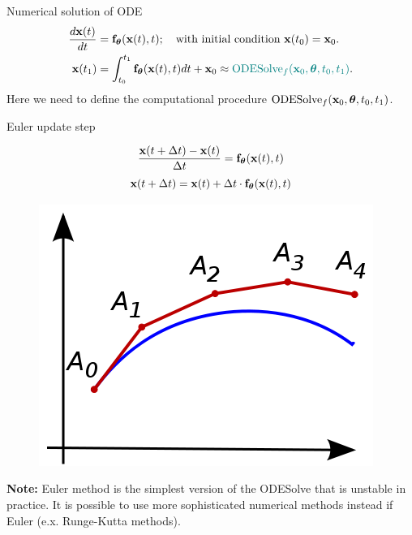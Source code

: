 \begin{frame}{Numerical solution of ODE}
	\vspace{-0.5cm}
	\begin{align*}
		\frac{d \mathbf{x}(t)}{dt} &= \mathbf{f}_{\boldsymbol{\theta}}(\mathbf{x}(t), t); \quad \text{with initial condition }\mathbf{x}(t_0) = \mathbf{x}_0. \\
		\mathbf{x}(t_1) &= \int^{t_1}_{t_0} \mathbf{f}_{\boldsymbol{\theta}}(\mathbf{x}(t), t) d t  + \mathbf{x}_0 \approx {\color{teal}\text{ODESolve}_f(\mathbf{x}_0, \boldsymbol{\theta}, t_0, t_1)}.
	\end{align*}
	Here we need to define the computational procedure $\text{ODESolve}_f(\mathbf{x}_0, \boldsymbol{\theta}, t_0, t_1)$.
	\begin{block}{Euler update step}
		\begin{minipage}[t]{0.6\columnwidth}
			\vspace{-0.5cm}
			\[
	  			\frac{\mathbf{x}(t + \Delta t) - \mathbf{x}(t)}{\Delta t} = \mathbf{f}_{\boldsymbol{\theta}}(\mathbf{x}(t), t)
			\]
			\[
	  			\mathbf{x}(t + \Delta t) = \mathbf{x}(t) + \Delta t \cdot \mathbf{f}_{\boldsymbol{\theta}}(\mathbf{x}(t), t)
			\]
		\end{minipage}%
		\begin{minipage}[t]{0.4\columnwidth}
			\vspace{-0.3cm}
			\begin{figure}
				\centering
				\includegraphics[width=0.7\linewidth]{figs/euler}
			\end{figure}
		\end{minipage}
	\end{block}
	\textbf{Note:} Euler method is the simplest version of the ODESolve that is unstable in practice. It is possible to use more sophisticated numerical methods instead if Euler (e.x. Runge-Kutta methods).
\end{frame}
